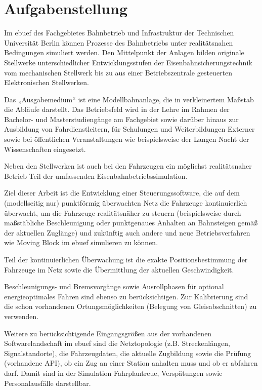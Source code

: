 \section*{Aufgabenstellung}

Im \ac{ebuef} des Fachgebietes Bahnbetrieb und Infrastruktur der Technischen Universität Berlin können Prozesse des Bahnbetriebs unter realitätsnahen Bedingungen simuliert werden. Den Mittelpunkt der Anlagen bilden originale Stellwerke unterschiedlicher Entwicklungsstufen der Eisenbahnsicherungstechnik vom mechanischen Stellwerk bis zu aus einer Betriebszentrale gesteuerten Elektronischen Stellwerken.

Das „Ausgabemedium“ ist eine Modellbahnanlage, die in verkleinertem Maßstab die Abläufe darstellt. Das Betriebsfeld wird in der Lehre im Rahmen der Bachelor- und Masterstudiengänge am Fachgebiet sowie darüber hinaus zur Ausbildung von Fahrdienstleitern, für Schulungen und Weiterbildungen Externer sowie bei öffentlichen Veranstaltungen wie beispielsweise der Langen Nacht der Wissenschaften eingesetzt.

Neben den Stellwerken ist auch bei den Fahrzeugen ein möglichst realitätsnaher Betrieb Teil der umfassenden Eisenbahnbetriebssimulation.

Ziel dieser Arbeit ist die Entwicklung einer Steuerungssoftware, die auf dem (modellseitig nur) punktförmig überwachten Netz die Fahrzeuge kontinuierlich überwacht, um die Fahrzeuge realitätsnäher zu steuern (beispielsweise durch maßstäbliche Beschleunigung oder punktgenaues Anhalten an Bahnsteigen gemäß der aktuellen Zuglänge) und zukünftig auch andere und neue Betriebsverfahren wie Moving Block im \ac{ebuef} simulieren zu können.

Teil der kontinuierlichen Überwachung ist die exakte Positionsbestimmung der Fahrzeuge im Netz sowie die Übermittlung der aktuellen Geschwindigkeit.

Beschleunigungs- und Bremsvorgänge sowie Ausrollphasen für optional energieoptimales Fahren sind ebenso zu berücksichtigen. Zur Kalibrierung sind die schon vorhandenen Ortungsmöglichkeiten (Belegung von Gleisabschnitten) zu verwenden.

Weitere zu berücksichtigende Eingangsgrößen aus der vorhandenen Softwarelandschaft im \ac{ebuef} sind die Netztopologie (z.B. Streckenlängen, Signalstandorte), die Fahrzeugdaten, die aktuelle Zugbildung sowie die Prüfung (vorhandene API), ob ein Zug an einer Station anhalten muss und ob er abfahren darf. Damit sind in der Simulation Fahrplantreue, Verspätungen sowie Personalausfälle darstellbar.

